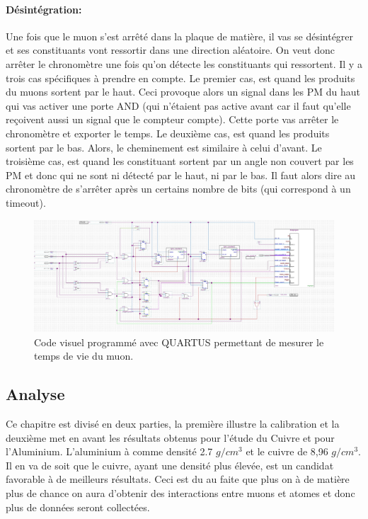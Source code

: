 \documentclass[12pt]{article}
\begin{document}
\paragraph{Désintégration:}
Une fois que le muon s'est arrêté dans la plaque de matière, il vas se désintégrer et ses constituants vont ressortir dans une direction aléatoire. On veut donc arrêter le chronomètre une fois qu'on détecte les constituants qui ressortent. Il y a trois cas spécifiques à prendre en compte. Le premier cas, est quand les produits du muons sortent par le haut. Ceci provoque alors un signal dans les PM du haut qui vas activer une porte AND (qui n'étaient pas active avant car il faut qu'elle reçoivent aussi un signal que le compteur compte). Cette porte vas arrêter le chronomètre et exporter le temps. Le deuxième cas, est quand les produits sortent par le bas. Alors, le cheminement est similaire à celui d'avant. Le troisième cas, est quand les constituant sortent par un angle non couvert par les PM et donc qui ne sont ni détecté par le haut, ni par le bas. Il faut alors dire au chronomètre de s'arrêter après un certains nombre de bits (qui correspond à un timeout).

\begin{figure}[htpb!]
    \centering
    \includegraphics[width=1\textwidth]{Images/Schemas/Quartus.jpg}
    \caption{Code visuel programmé avec QUARTUS permettant de mesurer le temps de vie du muon.}
    \label{fig:Quartus}
\end{figure}

\subsection{Analyse}

Ce chapitre est divisé en deux parties, la première illustre la calibration et la deuxième met en avant les résultats obtenus pour l'étude du Cuivre et pour l'Aluminium.
L'aluminium à comme densité 2.7 $g/cm^{3}$ et le cuivre de 8,96 $g/cm^{3}$. Il en va de soit que le cuivre, ayant une densité plus élevée, est un candidat favorable à de meilleurs résultats. Ceci est du au faite que plus on à de matière plus de chance on aura d'obtenir des interactions entre muons et atomes et donc plus de données seront collectées. 
\end{document}
